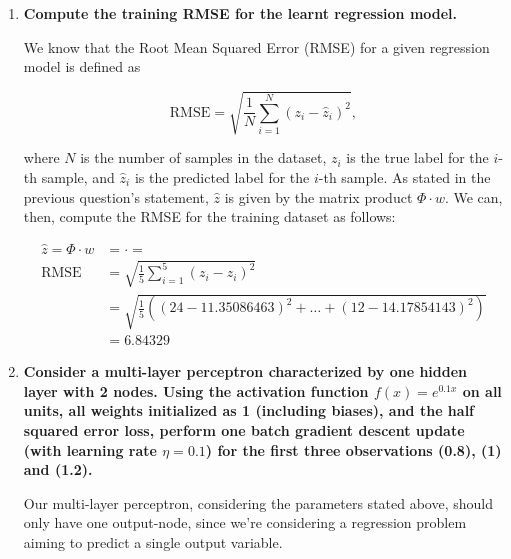 \documentclass[12pt]{article}
\begin{document}
\begin{enumerate}[leftmargin=\labelsep]
        \pagebreak

  \item \textbf{Compute the training RMSE for the learnt regression model.}

        We know that the Root Mean Squared Error (RMSE) for a given regression model is
        defined as

        \begin{equation*}
          \text{RMSE} = \sqrt{\frac{1}{N} \sum_{i=1}^N (z_i - \hat{z}_i)^2},
        \end{equation*}

        where $N$ is the number of samples in the dataset, $z_i$ is the true label for
        the $i$-th sample, and $\hat{z}_i$ is the predicted label for the $i$-th sample.
        As stated in the previous question's statement, $\hat{z}$ is given by the matrix product
        $\Phi \cdot w$. We can, then, compute the RMSE for the training dataset as follows:

        \begin{equation*}
          \begin{aligned}
            \hat{z} = \Phi \cdot w & =  \cdot 
            =                                                                                  \\
            \text{RMSE}            & = \sqrt{\frac{1}{5} \sum_{i=1}^5 (z_i - \hat{z}_i)^2}                                    \\
                                   & = \sqrt{\frac{1}{5} \left( (24 - 11.35086463)^2 + \hdots + (12 - 14.17854143)^2 \right)} \\
                                   & = 6.84329
          \end{aligned}
        \end{equation*}

        \pagebreak

  \item \textbf{Consider a multi-layer perceptron characterized by one hidden layer with 2 nodes.
          Using the activation function $f(x) = e^{0.1x}$ on all units, all weights
          initialized as 1 (including biases), and the half squared error loss, perform
          one batch gradient descent update (with learning rate $\eta = 0.1$)
          for the first three observations (0.8), (1) and (1.2).
        }

        Our multi-layer perceptron, considering the parameters stated above, should only
        have one output-node, since we're considering a regression problem aiming to
        predict a single output variable.


\end{enumerate}
\end{document}
